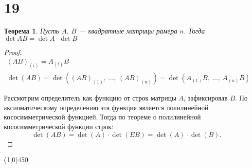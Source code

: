 \documentclass[a4paper,12pt]{article}
\newtheorem*{theorem}{Теорема}
\begin{document}
	\section*{19}
	
	\begin{theorem}
		Пусть $A,\ B$ — квадратные матрицы рамера $n$. Тогда $\det{AB} = \det{A}\cdot\det{B}$
	\end{theorem}
	\begin{proof}
		\begin{gather*}
		(AB)_{(i)}=A_{(i)}B \\
		\det(AB)=\det( (AB)_{(1)},\ \ldots,\ (AB)_{(n)} ) = \det (A_{(1)}B,\ \ldots,\ A_{(n)}B )
		\end{gather*}
		
		Рассмотрим определитель как функцию от строк матрицы $A$, зафиксировав $B$. По аксиоматическому определению эта функция является полилинейной кососимметрической функцией. Тогда по теореме о полилинейной кососимметрической функции строк: 
		$$\det(AB) = \det(A) \cdot \det (EB) = \det(A) \cdot \det(B).$$
	\end{proof}
	\begin{center}
		\line(1,0){450}
	\end{center}
\end{document}
